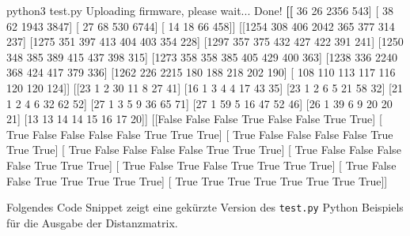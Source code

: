 \documentclass[
  11pt,
  a4paper,
  oneside, openany  ,captions=tableheading
]{scrbook}
\newenvironment{Shaded}{\begin{snugshade}}{\end{snugshade}}
\newcommand{\BuiltInTok}[1]{\textcolor[rgb]{0.00,0.23,0.31}{#1}}
\newcommand{\ErrorTok}[1]{\textcolor[rgb]{0.68,0.00,0.00}{#1}}
\newcommand{\ExtensionTok}[1]{\textcolor[rgb]{0.00,0.23,0.31}{#1}}
\newcommand{\KeywordTok}[1]{\textcolor[rgb]{0.00,0.23,0.31}{\textbf{#1}}}
\newcommand{\NormalTok}[1]{\textcolor[rgb]{0.00,0.23,0.31}{#1}}
\theoremstyle{remark}
\begin{document}
\begin{Shaded}
\begin{Highlighting}[]
\ExtensionTok{python3}\NormalTok{ test.py }
\ExtensionTok{Uploading}\NormalTok{ firmware, please wait...}
\ExtensionTok{Done!}
\KeywordTok{[[}\NormalTok{  36   26 2356  }\ErrorTok{543}\ExtensionTok{]}
 \BuiltInTok{[}\NormalTok{  38   62 1943 }\ErrorTok{3847}\ExtensionTok{]}
 \BuiltInTok{[}\NormalTok{  27   68  530 }\ErrorTok{6744}\ExtensionTok{]}
 \BuiltInTok{[}\NormalTok{  14   18   66  }\ErrorTok{458]]} \ExtensionTok{[[1254}\NormalTok{  308  406 2042  365  377  314  237]}
 \ExtensionTok{[1275}\NormalTok{  351  397  413  404  403  354  228]}
 \ExtensionTok{[1297}\NormalTok{  357  375  432  427  422  391  241]}
 \ExtensionTok{[1250}\NormalTok{  348  385  389  415  437  398  315]}
 \ExtensionTok{[1273}\NormalTok{  358  358  385  405  429  400  363]}
 \ExtensionTok{[1238}\NormalTok{  336 2240  368  424  417  379  336]}
 \ExtensionTok{[1262}\NormalTok{  226 2215  180  188  218  202  190]}
 \BuiltInTok{[}\NormalTok{ 108  110  113  }\ErrorTok{117}  \ExtensionTok{116}\NormalTok{  120  120  124]] [[23  1  2 30 11  8 27 41]}
 \ExtensionTok{[16}\NormalTok{  1  3  4  4 17 43 35]}
 \ExtensionTok{[23}\NormalTok{  1  2  6  5 21 58 32]}
 \ExtensionTok{[21}\NormalTok{  1  2  4  6 32 62 52]}
 \ExtensionTok{[27}\NormalTok{  1  3  5  9 36 65 71]}
 \ExtensionTok{[27}\NormalTok{  1 59  5 16 47 52 46]}
 \ExtensionTok{[26}\NormalTok{  1 39  6  9 20 20 21]}
 \ExtensionTok{[13}\NormalTok{ 13 14 14 15 16 17 20]] [[False False False  True False False  True  True]}
 \BuiltInTok{[}\NormalTok{ True False False }\ErrorTok{False} \ExtensionTok{False}\NormalTok{  True  True  True]}
 \BuiltInTok{[}\NormalTok{ True False False }\ErrorTok{False} \ExtensionTok{False}\NormalTok{  True  True  True]}
 \BuiltInTok{[}\NormalTok{ True False False }\ErrorTok{False} \ExtensionTok{False}\NormalTok{  True  True  True]}
 \BuiltInTok{[}\NormalTok{ True False False }\ErrorTok{False} \ExtensionTok{False}\NormalTok{  True  True  True]}
 \BuiltInTok{[}\NormalTok{ True False  True }\ErrorTok{False}  \ExtensionTok{True}\NormalTok{  True  True  True]}
 \BuiltInTok{[}\NormalTok{ True False False  }\ErrorTok{True}  \ExtensionTok{True}\NormalTok{  True  True  True]}
 \BuiltInTok{[}\NormalTok{ True  True  True  }\ErrorTok{True}  \ExtensionTok{True}\NormalTok{  True  True  True]]}
\end{Highlighting}
\end{Shaded}

Folgendes Code Snippet zeigt eine gekürzte Version des \texttt{test.py}
Python Beispiels für die Ausgabe der Distanzmatrix.
\end{document}
